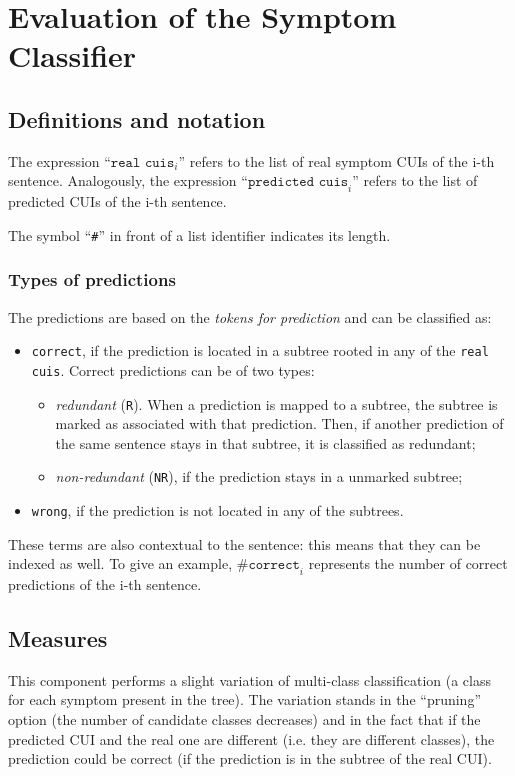 \section{Evaluation of the Symptom Classifier}
\subsection{Definitions and notation}

The expression ``$\texttt{real cuis}_{i}$'' refers to the list of real symptom CUIs of the i-th sentence. Analogously, the expression ``$\texttt{predicted cuis}_{i}$'' refers to the list of predicted CUIs of the i-th sentence.

The symbol ``\texttt{\#}'' in front of a list identifier indicates its length.

\subsubsection{Types of predictions}
The predictions are based on the \textit{tokens for prediction} and can be classified as:
\begin{itemize}
  \item \texttt{correct}, if the prediction is located in a subtree rooted in any of the \texttt{real cuis}. Correct predictions can be of two types:
    \begin{itemize}
      \item \textit{redundant} (\texttt{R}). When a prediction is mapped to a subtree, the subtree is marked as associated with that prediction. Then, if another prediction of the same sentence stays in that subtree, it is classified as redundant;
      \item \textit{non-redundant} (\texttt{NR}), if the prediction stays in a unmarked subtree;
    \end{itemize}
  \item \texttt{wrong}, if the prediction is not located in any of the subtrees.
\end{itemize}

These terms are also contextual to the sentence: this means that they can be indexed as well. To give an example, $\texttt{\#correct}_{i}$ represents the number of correct predictions of the i-th sentence.

\subsection{Measures}
This component performs a slight variation of multi-class classification (a class for each symptom present in the tree). The variation stands in the ``pruning'' option (the number of candidate classes decreases) and in the fact that if the predicted CUI and the real one are different (i.e. they are different classes), the prediction could be correct (if the prediction is in the subtree of the real CUI).

